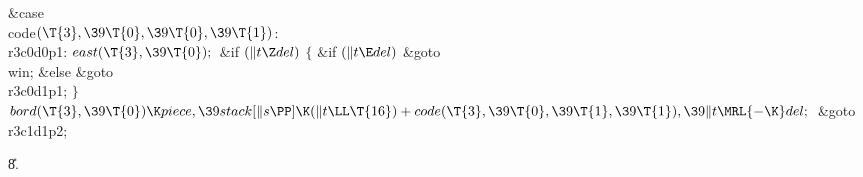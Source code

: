 \&{case} \\{code}${}(\T{3},\39\T{0},\39\T{0},\39\T{1}){}$:\5
\\{r3c0d0p1}:\5
${}\\{east}(\T{3},\39\T{0});{}$\6
\&{if} ${}(\|t\Z\\{del}){}$\5
${}\{{}$\5
\1\&{if} ${}(\|t\E\\{del}){}$\1\5
\&{goto} \\{win};\5
\2\&{else}\1\5
\&{goto} \\{r3c0d1p1};\5
\2${}\}{}$\2\6
${}\\{bord}(\T{3},\39\T{0})\K\\{piece},\39\\{stack}[\|s\PP]\K(\|t\LL\T{16})+%
\\{code}(\T{3},\39\T{0},\39\T{1},\39\T{1}),\39\|t\MRL{-{\K}}\\{del};{}$\6
\&{goto} \\{r3c1d1p2};\par
\U8.\fi

